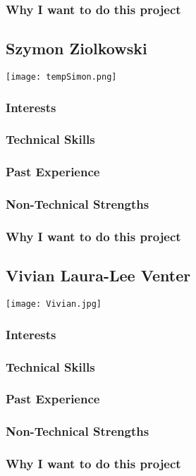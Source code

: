 \subsubsection{Why I want to do this project}

\subsection{Szymon Ziolkowski}
\texttt{[image: tempSimon.png]}

\subsubsection{Interests}
\subsubsection{Technical Skills}
\subsubsection{Past Experience}
\subsubsection{Non-Technical Strengths}
\subsubsection{Why I want to do this project}

\subsection{Vivian Laura-Lee Venter}
\texttt{[image: Vivian.jpg]}

\subsubsection{Interests}
\subsubsection{Technical Skills}
\subsubsection{Past Experience}
\subsubsection{Non-Technical Strengths}
\subsubsection{Why I want to do this project}
